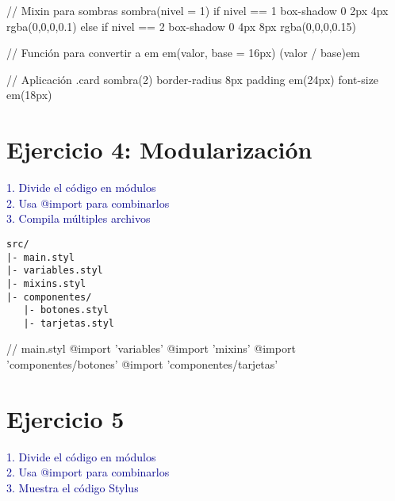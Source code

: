 \documentclass[12pt, a4paper]{article}
\newcommand{\enunciado}[1]{
    \vspace{0.5em}
    \noindent\colorbox{blue!10}{
        \parbox{\dimexpr\textwidth-2\fboxsep}{
            \small\sffamily\textcolor{darkblue}{#1}
        }
    }
    \vspace{0.5em}
}
\begin{document}
\begin{codebox}[title=Stylus]
// Mixin para sombras
sombra(nivel = 1)
    if nivel == 1
        box-shadow 0 2px 4px rgba(0,0,0,0.1)
    else if nivel == 2
        box-shadow 0 4px 8px rgba(0,0,0,0.15)

// Función para convertir a em
em(valor, base = 16px)
    (valor / base)em

// Aplicación
.card
    sombra(2)
    border-radius 8px
    padding em(24px)
    font-size em(18px)
\end{codebox}

\section*{Ejercicio 4: Modularización}
\enunciado{
    1. Divide el código en módulos \\
    2. Usa @import para combinarlos \\
    3. Compila múltiples archivos
}

\begin{codebox}[title=Stylus]
\begin{verbatim}
src/
|- main.styl
|- variables.styl
|- mixins.styl
|- componentes/
   |- botones.styl
   |- tarjetas.styl
\end{verbatim}

// main.styl
@import 'variables'
@import 'mixins'
@import 'componentes/botones'
@import 'componentes/tarjetas'
\end{codebox}


\section*{Ejercicio 5}
\enunciado{
    1. Divide el código en módulos \\
    2. Usa @import para combinarlos \\
    3. Muestra el código Stylus
}

\end{document}
